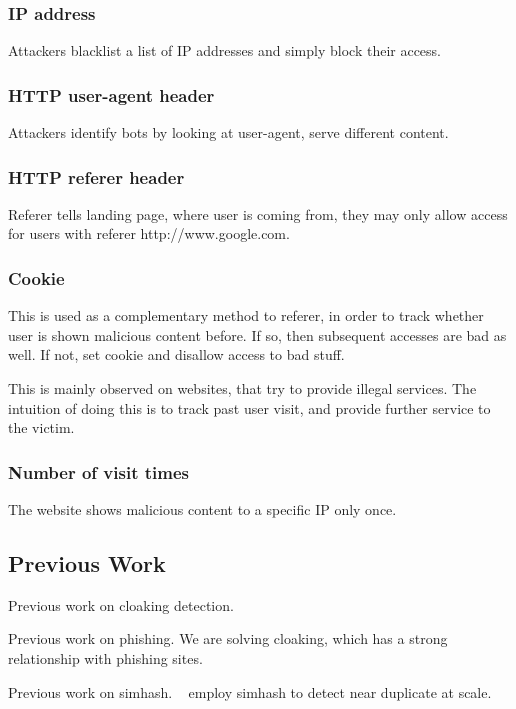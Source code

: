 \subsubsection{IP address}
Attackers blacklist a list of IP addresses and simply block their access.
\subsubsection{HTTP user-agent header}
Attackers identify bots by looking at user-agent, serve different content.
\subsubsection{HTTP referer header}
Referer tells landing page, where user is coming from, they may only allow
access for users with referer http://www.google.com.
\subsubsection{Cookie}
This is used as a complementary method to referer, in order to track whether
user is shown malicious content before. If so, then subsequent accesses are
bad as well. If not, set cookie and disallow access to bad stuff.

This is mainly observed on websites, that try to provide illegal services. The
intuition of doing this is to track past user visit, and provide further service
to the victim.
\subsubsection{Number of visit times}
The website shows malicious content to a specific IP only once.

\subsection{Previous Work}
Previous work on cloaking detection.

Previous work on phishing. We are solving cloaking, which has a strong
relationship with phishing sites.

Previous work on simhash. ~\cite{manku2007detecting} employ simhash to detect
near duplicate at scale.

